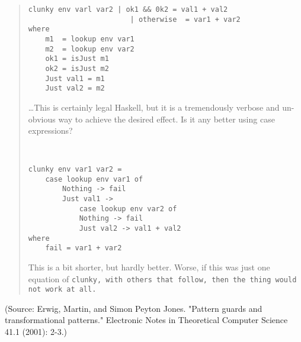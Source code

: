 \documentclass[manuscript,screen,review, 12pt]{acmart}
\begin{document}
\begin{outline}[enumerate]
\begin{quote}
    \begin{minipage}{\textwidth}
        \begin{verbatim}
clunky env varl var2 | ok1 && 0k2 = val1 + val2 
                        | otherwise  = var1 + var2 
where 
    m1  = lookup env var1 
    m2  = lookup env var2
    ok1 = isJust m1 
    ok2 = isJust m2 
    Just val1 = m1 
    Just val2 = m2    
        \end{verbatim}        
    \end{minipage}
        
    \dots This is certainly legal Haskell, but it is a tremendously verbose and
    un-obvious way to achieve the desired effect. Is it any better using case
    expressions?

    
        \begin{minipage}{\textwidth}
            \begin{verbatim}


clunky env var1 var2 = 
    case lookup env var1 of 
        Nothing -> fail 
        Just val1 -> 
            case lookup env var2 of 
            Nothing -> fail 
            Just val2 -> val1 + val2
where 
    fail = var1 + var2
            \end{verbatim}
        \end{minipage}
    
        This is a bit shorter, but hardly better. Worse, if this was just one
        equation of \tt{clunky}, with others that follow, then the thing would
        not work at all.

    \end{quote}

    (Source: Erwig, Martin, and Simon Peyton Jones. "Pattern guards and transformational patterns." Electronic Notes in Theoretical Computer Science 41.1 (2001): 2-3.)


\end{outline}
\end{document}
